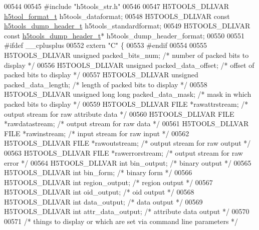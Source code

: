 \begin{DoxyCode}
{{{{{{{{{{{{{{{{{{{00544 
00545 \textcolor{preprocessor}{#include "h5tools\_str.h"}
00546 
00547 H5TOOLS\_DLLVAR \hyperlink{structh5tool__format__t}{h5tool\_format\_t} h5tools\_dataformat;
00548 H5TOOLS\_DLLVAR \textcolor{keyword}{const} \hyperlink{structh5tools__dump__header__t}{h5tools\_dump\_header\_t} h5tools\_standardformat;
00549 H5TOOLS\_DLLVAR \textcolor{keyword}{const} \hyperlink{structh5tools__dump__header__t}{h5tools\_dump\_header\_t}* h5tools\_dump\_header\_format;
00550 
00551 \textcolor{preprocessor}{#ifdef \_\_cplusplus}
00552 \textcolor{keyword}{extern} \textcolor{stringliteral}{"C"} \{
00553 \textcolor{preprocessor}{#endif}
00554 
00555 H5TOOLS\_DLLVAR \textcolor{keywordtype}{unsigned} packed\_bits\_num;    \textcolor{comment}{/* number of packed bits to display */}
00556 H5TOOLS\_DLLVAR \textcolor{keywordtype}{unsigned} packed\_data\_offset; \textcolor{comment}{/* offset of packed bits to display */}
00557 H5TOOLS\_DLLVAR \textcolor{keywordtype}{unsigned} packed\_data\_length; \textcolor{comment}{/* length of packed bits to display */}
00558 H5TOOLS\_DLLVAR \textcolor{keywordtype}{unsigned} \textcolor{keywordtype}{long} \textcolor{keywordtype}{long} packed\_data\_mask;  \textcolor{comment}{/* mask in which packed bits to display */}
00559 H5TOOLS\_DLLVAR FILE   *rawattrstream;       \textcolor{comment}{/* output stream for raw attribute data */}
00560 H5TOOLS\_DLLVAR FILE   *rawdatastream;       \textcolor{comment}{/* output stream for raw data */}
00561 H5TOOLS\_DLLVAR FILE   *rawinstream;         \textcolor{comment}{/* input stream for raw input */}
00562 H5TOOLS\_DLLVAR FILE   *rawoutstream;        \textcolor{comment}{/* output stream for raw output */}
00563 H5TOOLS\_DLLVAR FILE   *rawerrorstream;      \textcolor{comment}{/* output stream for raw error */}
00564 H5TOOLS\_DLLVAR \textcolor{keywordtype}{int}     bin\_output;          \textcolor{comment}{/* binary output */}
00565 H5TOOLS\_DLLVAR \textcolor{keywordtype}{int}     bin\_form;            \textcolor{comment}{/* binary form */}
00566 H5TOOLS\_DLLVAR \textcolor{keywordtype}{int}     region\_output;       \textcolor{comment}{/* region output */}
00567 H5TOOLS\_DLLVAR \textcolor{keywordtype}{int}     oid\_output;          \textcolor{comment}{/* oid output */}
00568 H5TOOLS\_DLLVAR \textcolor{keywordtype}{int}     data\_output;         \textcolor{comment}{/* data output */}
00569 H5TOOLS\_DLLVAR \textcolor{keywordtype}{int}     attr\_data\_output;    \textcolor{comment}{/* attribute data output */}
00570 
00571 \textcolor{comment}{/* things to display or which are set via command line parameters */}
}}}}}}}}}}}}}}}}}}}
\end{DoxyCode}
